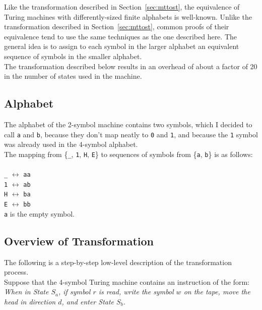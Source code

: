 \documentclass[11pt]{report}
\begin{document}
Like the transformation described in Section~\ref{sec:mttost}, the equivalence of Turing machines with differently-sized finite alphabets is well-known. Unlike the transformation described in Section~\ref{sec:mttost}, common proofs of their equivalence tend to use the same techniques as the one described here. The general idea is to assign to each symbol in the larger alphabet an equivalent sequence of symbols in the smaller alphabet. \\

The transformation described below results in an overhead of about a factor of 20 in the number of states used in the machine.

\subsection{Alphabet}

The alphabet of the 2-symbol machine contains two symbols, which I decided to call \texttt{a} and \texttt{b}, because they don't map neatly to \texttt{0} and \texttt{1}, and because the \texttt{1} symbol was already used in the 4-symbol alphabet. \\

The mapping from \{\texttt{\_}, \texttt{1}, \texttt{H}, \texttt{E}\} to sequences of symbols from \{\texttt{a}, \texttt{b}\} is as follows: \\ \\
\texttt{\_} $\leftrightarrow$ \texttt{aa} \\
\texttt{1} $\leftrightarrow$ \texttt{ab} \\
\texttt{H} $\leftrightarrow$ \texttt{ba} \\
\texttt{E} $\leftrightarrow$ \texttt{bb} \\

\texttt{a} is the empty symbol.

\subsection{Overview of Transformation \label{sec:mstotssteps}}

The following is a step-by-step low-level description of the transformation process. \\

Suppose that the 4-symbol Turing machine contains an instruction of the form: \\

\emph{When in State $S_a$, if symbol $r$ is read, write the symbol $w$ on the tape, move the head in direction $d$, and enter State $S_b$.} \\
\end{document}
